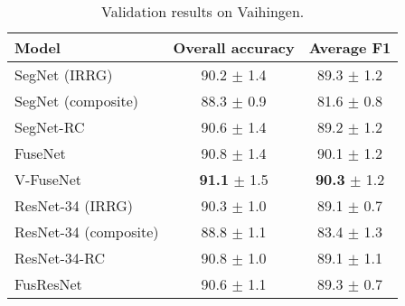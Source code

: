 \begin{table}
    \caption{Validation results on Vaihingen.}
    \label{table:val_vaihingen}
	\begin{tabularx}{\textwidth}{Y c c}
    \toprule
    Model & Overall accuracy & Average F1\\
    \midrule
    SegNet (IRRG) & 90.2 {\small $\pm$ 1.4} & 89.3 {\small $\pm$ 1.2}\\
    SegNet (composite) & 88.3 {\small $\pm$ 0.9} & 81.6 {\small $\pm$ 0.8}\\
    SegNet-RC & 90.6 {\small $\pm$ 1.4} & 89.2 {\small $\pm$ 1.2}\\
    FuseNet & 90.8 {\small $\pm$ 1.4} & 90.1 {\small $\pm$ 1.2}\\
    V-FuseNet & \textbf{91.1} {\small $\pm$ 1.5} & \textbf{90.3} {\small $\pm$ 1.2}\\
    \midrule
    ResNet-34 (IRRG) & 90.3 {\small $\pm$ 1.0} & 89.1 {\small $\pm$ 0.7}\\
    ResNet-34 (composite) & 88.8 {\small $\pm$ 1.1} & 83.4 {\small $\pm$ 1.3}\\
    ResNet-34-RC & 90.8 {\small $\pm$ 1.0} & 89.1 {\small $\pm$ 1.1}\\
    FusResNet & 90.6 {\small $\pm$ 1.1} & 89.3 {\small $\pm$ 0.7}\\
    \bottomrule
    \end{tabularx}
\end{table}


